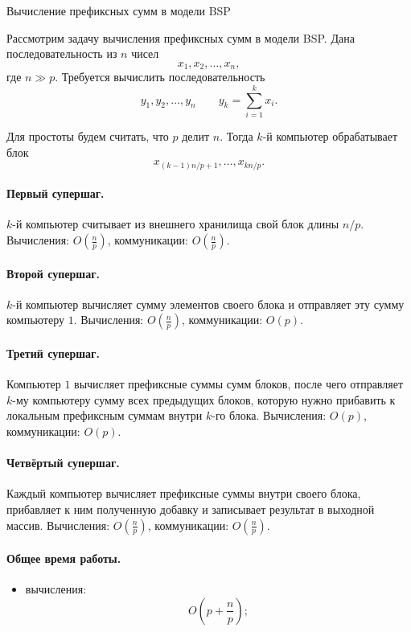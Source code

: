 \begin{Example}{Вычисление префиксных сумм в модели BSP}{}
	
	Рассмотрим задачу вычисления префиксных сумм в модели BSP. Дана последовательность из \(n\) чисел
	\[
	x_1, x_2, \dots, x_n,
	\]
	где \(n \gg p\). Требуется вычислить последовательность
	\[
	y_1, y_2, \dots, y_n \qquad y_k = \sum_{i=1}^k x_i.
	\]
	
	Для простоты будем считать, что \(p\) делит \(n\). Тогда \(k\)-й компьютер обрабатывает блок
	\[
	x_{(k-1)n/p+1}, \dots, x_{kn/p}.
	\]
	
	\paragraph{Первый супершаг.}
	\(k\)-й компьютер считывает из внешнего хранилища свой блок длины \(n/p\).
	Вычисления: \(O\!\left(\frac{n}{p}\right)\), коммуникации: \(O\!\left(\frac{n}{p}\right)\).
	
	\paragraph{Второй супершаг.}
	\(k\)-й компьютер вычисляет сумму элементов своего блока и отправляет эту сумму компьютеру \(1\).
	Вычисления: \(O\!\left(\frac{n}{p}\right)\), коммуникации: \(O(p)\).
	
	\paragraph{Третий супершаг.}
	Компьютер \(1\) вычисляет префиксные суммы сумм блоков, после чего отправляет \(k\)-му компьютеру сумму всех предыдущих блоков, которую нужно прибавить к локальным префиксным суммам внутри \(k\)-го блока.
	Вычисления: \(O(p)\), коммуникации: \(O(p)\).
	
	\paragraph{Четвёртый супершаг.}
	Каждый компьютер вычисляет префиксные суммы внутри своего блока, прибавляет к ним полученную добавку и записывает результат в выходной массив.
	Вычисления: \(O\!\left(\frac{n}{p}\right)\), коммуникации: \(O\!\left(\frac{n}{p}\right)\).
	
	\paragraph{Общее время работы.}
	\begin{itemize}
		\item вычисления:
		\[
		O\!\left(p+\frac{n}{p}\right);
		\]
		

\end{itemize}
\end{Example}
